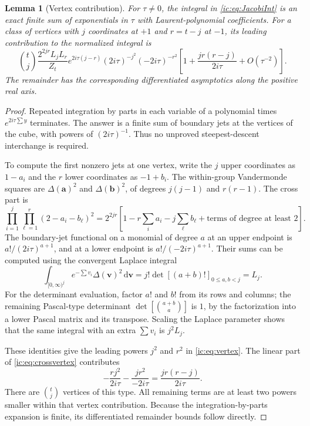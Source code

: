 \documentclass[11pt,a4paper]{article}
\numberwithin{equation}{section}
\newtheorem{lemma}[theorem]{Lemma}
\theoremstyle{definition}
\theoremstyle{remark}
\newcommand{\dd}{\mathrm d}
\newcommand{\Del}{\Delta}
\begin{document}
\begin{lemma}[Vertex contribution]\label{ic:lem:vertex}
For $\tau\ne0$, the integral in \eqref{ic:eq:JacobiInt} is an exact finite
sum of exponentials in $\tau$ with Laurent-polynomial coefficients.
For a class of vertices with $j$ coordinates at $+1$ and $r=t-j$ at
$-1$, its leading contribution to the normalized integral is
\begin{equation}\label{ic:eq:vertex}
 \binom tj\frac{2^{2jr}L_jL_r}{Z_t}
 e^{2i\tau(j-r)}(2i\tau)^{-j^2}(-2i\tau)^{-r^2}
 \left[1+\frac{jr(r-j)}{2i\tau}+O(\tau^{-2})\right].
\end{equation}
The remainder has the corresponding differentiated asymptotics along
the positive real axis.
\end{lemma}
\begin{proof}
Repeated integration by parts in each variable of a polynomial times
$e^{2i\tau\sum y}$ terminates. The answer is a finite sum of boundary
jets at the vertices of the cube, with powers of $(2i\tau)^{-1}$. Thus no
unproved steepest-descent interchange is required.

To compute the first nonzero jets at one vertex, write the $j$ upper
coordinates as $1-a_i$ and the $r$ lower coordinates as $-1+b_i$. The
within-group Vandermonde squares are $\Del(\boldsymbol a)^2$ and
$\Del(\boldsymbol b)^2$, of degrees $j(j-1)$ and $r(r-1)$. The cross
part is
\begin{equation}\label{ic:eq:crossvertex}
 \prod_{i=1}^j\prod_{\ell=1}^r(2-a_i-b_\ell)^2
 =2^{2jr}\left[1-r\sum_i a_i-j\sum_\ell b_\ell
                    +\text{terms of degree at least }2\right].
\end{equation}
The boundary-jet functional on a monomial of degree $a$ at an upper
endpoint is $a!/(2i\tau)^{a+1}$, and at a lower endpoint is
$a!/(-2i\tau)^{a+1}$. Their sums can be computed using the convergent
Laplace integral
\[
 \int_{[0,\infty)^j}e^{-\sum v_i}\Del(\boldsymbol v)^2\,\dd\boldsymbol v
 =j!\det[(a+b)!]_{0\le a,b<j}=L_j.
\]
For the determinant evaluation, factor $a!$ and $b!$ from its rows and
columns; the remaining Pascal-type determinant
$\det[\binom{a+b}{a}]$ is $1$, by the factorization into a lower Pascal
matrix and its transpose. Scaling the Laplace parameter shows that the
same integral with an extra $\sum v_i$ is $j^2L_j$.

These identities give the leading powers $j^2$ and $r^2$ in
\eqref{ic:eq:vertex}. The linear part of \eqref{ic:eq:crossvertex} contributes
\[
 -\frac{rj^2}{2i\tau}-\frac{jr^2}{-2i\tau}
 =\frac{jr(r-j)}{2i\tau}.
\]
There are $\binom tj$ vertices of this type. All remaining terms are at
least two powers smaller within that vertex contribution. Because the
integration-by-parts expansion is finite, its differentiated remainder
bounds follow directly.
\end{proof}
\end{document}
